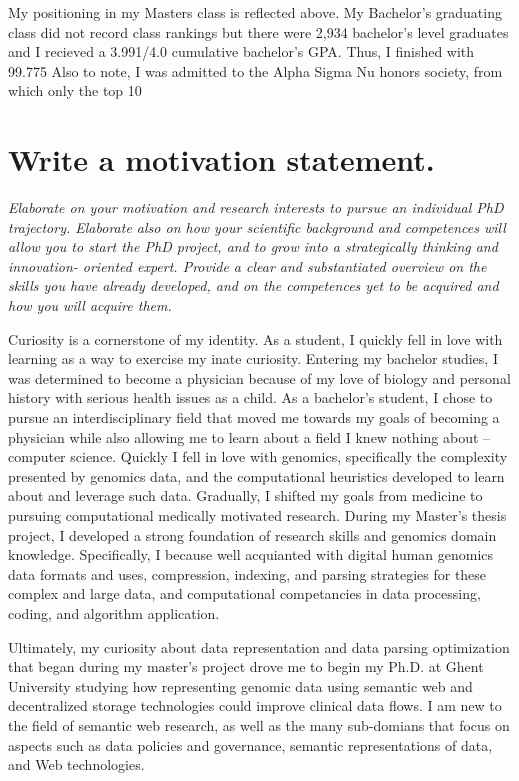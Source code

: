 {My positioning in my Masters class is reflected above.
My Bachelor's graduating class did not record class rankings but there were 2,934 bachelor's level graduates and I recieved a 3.991/4.0 cumulative bachelor's GPA. Thus, I finished with 99.775%
Also to note, I was admitted to the Alpha Sigma Nu honors society, from which only the top 10%


\section{Write a motivation statement.}
\textit{
Elaborate on your motivation and research interests to pursue an individual PhD trajectory. 
Elaborate also on how your scientific background and competences will allow you to start the PhD project, and to grow into a strategically thinking and innovation- oriented expert. 
Provide a clear and substantiated overview on the skills you have already developed, and on the competences yet to be acquired and how you will acquire them.
}

Curiosity is a cornerstone of my identity. 
As a student, I quickly fell in love with learning as a way to exercise my inate curiosity. 
Entering my bachelor studies, I was determined to become a physician because of my love of biology and personal history with serious health issues as a child. 
As a bachelor's student, I chose to pursue an interdisciplinary field that moved me towards my goals of becoming a physician while also allowing me to learn about a field I knew nothing about -- computer science.
Quickly I fell in love with genomics, specifically the complexity presented by genomics data, and the computational heuristics developed to learn about and leverage such data.
Gradually, I shifted my goals from medicine to pursuing computational medically motivated research.
During my Master's thesis project, I developed a strong foundation of research skills and genomics domain knowledge.
Specifically, I because well acquianted with digital human genomics data formats and uses, compression, indexing, and parsing strategies for these complex and large data, and computational competancies in data processing, coding, and algorithm application.

Ultimately, my curiosity about data representation and data parsing optimization that began during my master's project drove me to begin my Ph.D. at Ghent University studying how representing genomic data using semantic web and decentralized storage technologies could improve clinical data flows.
I am new to the field of semantic web research, as well as the many sub-domians that focus on aspects such as data policies and governance, semantic representations of data, and Web technologies.

}
